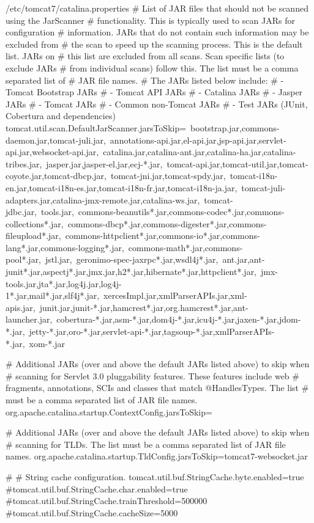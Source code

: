 \begin{lstdump}{/etc/tomcat7/catalina.properties}
# List of JAR files that should not be scanned using the JarScanner
# functionality. This is typically used to scan JARs for configuration
# information. JARs that do not contain such information may be excluded from
# the scan to speed up the scanning process. This is the default list. JARs on
# this list are excluded from all scans. Scan specific lists (to exclude JARs
# from individual scans) follow this. The list must be a comma separated list of
# JAR file names.
# The JARs listed below include:
# - Tomcat Bootstrap JARs
# - Tomcat API JARs
# - Catalina JARs
# - Jasper JARs
# - Tomcat JARs
# - Common non-Tomcat JARs
# - Test JARs (JUnit, Cobertura and dependencies)
tomcat.util.scan.DefaultJarScanner.jarsToSkip=\
bootstrap.jar,commons-daemon.jar,tomcat-juli.jar,\
annotations-api.jar,el-api.jar,jsp-api.jar,servlet-api.jar,websocket-api.jar,\
catalina.jar,catalina-ant.jar,catalina-ha.jar,catalina-tribes.jar,\
jasper.jar,jasper-el.jar,ecj-*.jar,\
tomcat-api.jar,tomcat-util.jar,tomcat-coyote.jar,tomcat-dbcp.jar,\
tomcat-jni.jar,tomcat-spdy.jar,\
tomcat-i18n-en.jar,tomcat-i18n-es.jar,tomcat-i18n-fr.jar,tomcat-i18n-ja.jar,\
tomcat-juli-adapters.jar,catalina-jmx-remote.jar,catalina-ws.jar,\
tomcat-jdbc.jar,\
tools.jar,\
commons-beanutils*.jar,commons-codec*.jar,commons-collections*.jar,\
commons-dbcp*.jar,commons-digester*.jar,commons-fileupload*.jar,\
commons-httpclient*.jar,commons-io*.jar,commons-lang*.jar,commons-logging*.jar,\
commons-math*.jar,commons-pool*.jar,\
jstl.jar,\
geronimo-spec-jaxrpc*.jar,wsdl4j*.jar,\
ant.jar,ant-junit*.jar,aspectj*.jar,jmx.jar,h2*.jar,hibernate*.jar,httpclient*.jar,\
jmx-tools.jar,jta*.jar,log4j.jar,log4j-1*.jar,mail*.jar,slf4j*.jar,\
xercesImpl.jar,xmlParserAPIs.jar,xml-apis.jar,\
junit.jar,junit-*.jar,hamcrest*.jar,org.hamcrest*.jar,ant-launcher.jar,\
cobertura-*.jar,asm-*.jar,dom4j-*.jar,icu4j-*.jar,jaxen-*.jar,jdom-*.jar,\
jetty-*.jar,oro-*.jar,servlet-api-*.jar,tagsoup-*.jar,xmlParserAPIs-*.jar,\
xom-*.jar

# Additional JARs (over and above the default JARs listed above) to skip when
# scanning for Servlet 3.0 pluggability features. These features include web
# fragments, annotations, SCIs and classes that match @HandlesTypes. The list
# must be a comma separated list of JAR file names.
org.apache.catalina.startup.ContextConfig.jarsToSkip=

# Additional JARs (over and above the default JARs listed above) to skip when
# scanning for TLDs. The list must be a comma separated list of JAR file names.
org.apache.catalina.startup.TldConfig.jarsToSkip=tomcat7-websocket.jar

#
# String cache configuration.
tomcat.util.buf.StringCache.byte.enabled=true
#tomcat.util.buf.StringCache.char.enabled=true
#tomcat.util.buf.StringCache.trainThreshold=500000
#tomcat.util.buf.StringCache.cacheSize=5000
\end{lstdump}

